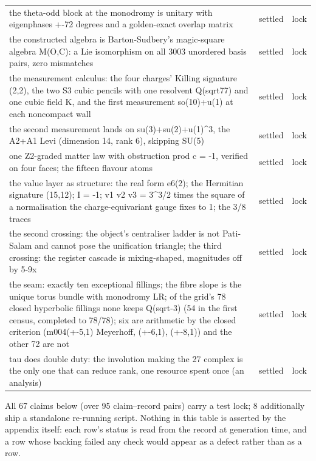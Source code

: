 \documentclass[11pt,a4paper]{article}
\theoremstyle{definition}
\theoremstyle{remark}
\begin{document}
\begin{longtable}{@{}p{9.2cm}p{2.9cm}p{2.0cm}@{}}
the theta-odd block at the monodromy is unitary with eigenphases +-72 degrees and a golden-exact overlap matrix & settled & lock \\
the constructed algebra is Barton-Sudbery's magic-square algebra M(O,C): a Lie isomorphism on all 3003 unordered basis pairs, zero mismatches & settled & lock \\
the measurement calculus: the four charges' Killing signature (2,2), the two S3 cubic pencils with one resolvent Q(sqrt77) and one cubic field K, and the first measurement so(10)+u(1) at each noncompact wall & settled & lock \\
the second measurement lands on su(3)+su(2)+u(1)\^{}3, the A2+A1 Levi (dimension 14, rank 6), skipping SU(5) & settled & lock \\
one Z2-graded matter law with obstruction prod c = -1, verified on four faces; the fifteen flavour atoms & settled & lock \\
the value layer as structure: the real form e6(2); the Hermitian signature (15,12); I = -1; v1 v2 v3 = 3\^{}{3/2} times the square of a normalisation the charge-equivariant gauge fixes to 1; the 3/8 traces & settled & lock \\
the second crossing: the object's centraliser ladder is not Pati-Salam and cannot pose the unification triangle; the third crossing: the register cascade is mixing-shaped, magnitudes off by 5-9x & settled & lock \\
the seam: exactly ten exceptional fillings; the fibre slope is the unique torus bundle with monodromy LR; of the grid's 78 closed hyperbolic fillings none keeps Q(sqrt-3) (54 in the first census, completed to 78/78); six are arithmetic by the closed criterion (m004(+-5,1) Meyerhoff, (+-6,1), (+-8,1)) and the other 72 are not & settled & lock \\
tau does double duty: the involution making the 27 complex is the only one that can reduce rank, one resource spent once (an analysis) & settled & lock \\
\end{longtable}\endgroup

\noindent\footnotesize All 67 claims below (over 95 claim--record pairs) carry a test lock; 8 additionally
ship a standalone re-running script. Nothing in this table is asserted by the appendix itself: each
row's status is read from the record at generation time, and a row whose backing failed any check
would appear as a defect rather than as a row.
\end{document}
